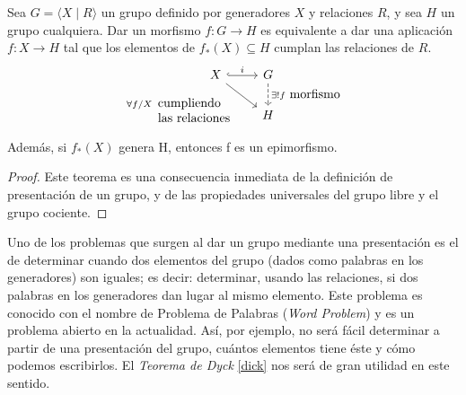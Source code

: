 
\begin{theorem}[Dyck]\label{dick}
Sea $G=\langle X\mid R \rangle$ un grupo definido por generadores $X$ y relaciones $R$, y sea $H$ un grupo cualquiera. Dar un morfismo $f:G\to H$ es equivalente a dar una aplicación $f:X\to H$ tal que los elementos de $f_*(X)\subseteq H$ cumplan las relaciones de $R$.
\[
\begin{tikzcd}
 X \arrow[r,hook]{}{i} \arrow[dr, ']{}{\forall f/X \; \; \parbox[t]{2.25cm}{ cumpliendo \\ las relaciones }} & G \arrow[d,dashrightarrow]{}{\exists !f \mbox{ morfismo}}\\
& H
\end{tikzcd}
\]


Además, si $f_*(X)$ genera H, entonces f es un epimorfismo.
\end{theorem}

\begin{proof}

Este teorema es una consecuencia inmediata de la definición de presentación de un grupo, y de las propiedades universales del grupo libre y el grupo cociente.
\end{proof}





Uno de los problemas que surgen al dar un grupo mediante una presentación es el de determinar cuando dos elementos del grupo (dados como palabras en los generadores) son iguales; es decir: determinar, usando las relaciones, si dos palabras en los generadores dan lugar al mismo elemento. Este problema es conocido con el nombre de Problema de Palabras (\textit{Word Problem}) y es un problema abierto en la actualidad. Así, por ejemplo, no será fácil determinar a partir de una presentación del grupo, cuántos elementos tiene éste y cómo podemos escribirlos. El \textit{Teorema de Dyck} \ref{dick} nos será de gran utilidad en este sentido.

